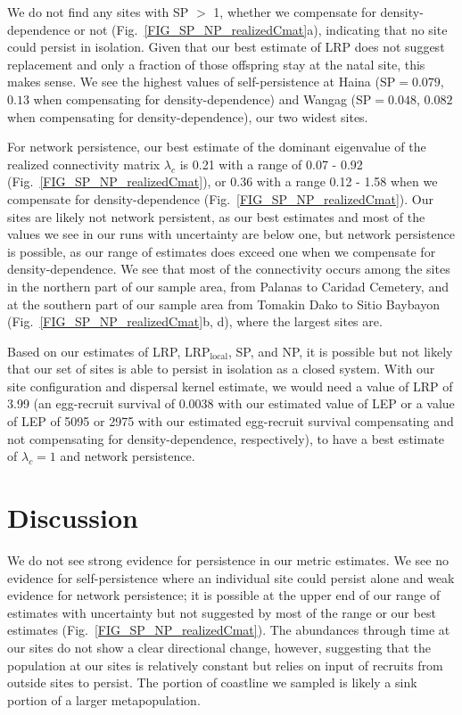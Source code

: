 \documentclass[12pt, oneside]{article}   	%
\begin{document}
We do not find any sites with SP $>$ 1, whether we compensate for density-dependence or not (Fig.\ \ref{FIG_SP_NP_realizedCmat}a), indicating that no site could persist in isolation. Given that our best estimate of LRP does not suggest replacement and only a fraction of those offspring stay at the natal site, this makes sense. We see the highest values of self-persistence at Haina ($\text{SP} = 0.079$, $0.13$ when compensating for density-dependence) and Wangag ($\text{SP} = 0.048$, $0.082$ when compensating for density-dependence), our two widest sites. 

For network persistence, our best estimate of the dominant eigenvalue of the realized connectivity matrix $\lambda_c$ is 0.21 with a range of 0.07 - 0.92 (Fig.\ \ref{FIG_SP_NP_realizedCmat}), or 0.36 with a range 0.12 - 1.58 when we compensate for density-dependence (Fig.\ \ref{FIG_SP_NP_realizedCmat}). Our sites are likely not network persistent, as our best estimates and most of the values we see in our runs with uncertainty are below one, but network persistence is possible, as our range of estimates does exceed one when we compensate for density-dependence. We see that most of the connectivity occurs among the sites in the northern part of our sample area, from Palanas to Caridad Cemetery, and at the southern part of our sample area from Tomakin Dako to Sitio Baybayon (Fig.\ \ref{FIG_SP_NP_realizedCmat}b, d), where the largest sites are. 

Based on our estimates of LRP, $\text{LRP}_\text{local}$, SP, and NP, it is possible but not likely that our set of sites is able to persist in isolation as a closed system. With our site configuration and dispersal kernel estimate, we would need a value of LRP of 3.99 (an egg-recruit survival of 0.0038 with our estimated value of LEP or a value of LEP of 5095 or 2975 with our estimated egg-recruit survival compensating and not compensating for density-dependence, respectively), to have a best estimate of $\lambda_c = 1$ and network persistence. 

\section*{Discussion}

We do not see strong evidence for persistence in our metric estimates. We see no evidence for self-persistence where an individual site could persist alone and weak evidence for network persistence; it is possible at the upper end of our range of estimates with uncertainty but not suggested by most of the range or our best estimates (Fig.\ \ref{FIG_SP_NP_realizedCmat}). The abundances through time at our sites do not show a clear directional change, however, suggesting that the population at our sites is relatively constant but relies on input of recruits from outside sites to persist. The portion of coastline we sampled is likely a sink portion of a larger metapopulation. 
\end{document}

